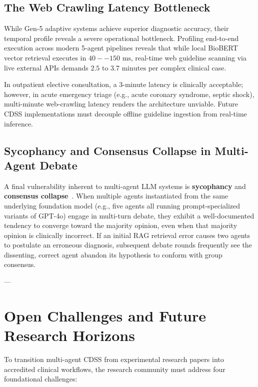 \documentclass[conference]{IEEEtran}
\begin{document}
\subsection{The Web Crawling Latency Bottleneck}
While Gen-5 adaptive systems achieve superior diagnostic accuracy, their temporal profile reveals a severe operational bottleneck. Profiling end-to-end execution across modern 5-agent pipelines reveals that while local BioBERT vector retrieval executes in $40--150\text{ ms}$, real-time web guideline scanning via live external APIs demands $2.5\text{ to }3.7\text{ minutes}$ per complex clinical case. 

In outpatient elective consultation, a 3-minute latency is clinically acceptable; however, in acute emergency triage (e.g., acute coronary syndrome, septic shock), multi-minute web-crawling latency renders the architecture unviable. Future CDSS implementations must decouple offline guideline ingestion from real-time inference.

\subsection{Sycophancy and Consensus Collapse in Multi-Agent Debate}
A final vulnerability inherent to multi-agent LLM systems is \textbf{sycophancy} and \textbf{consensus collapse}~\cite{chen2024reconcile}. When multiple agents instantiated from the same underlying foundation model (e.g., five agents all running prompt-specialized variants of GPT-4o) engage in multi-turn debate, they exhibit a well-documented tendency to converge toward the majority opinion, even when that majority opinion is clinically incorrect. If an initial RAG retrieval error causes two agents to postulate an erroneous diagnosis, subsequent debate rounds frequently see the dissenting, correct agent abandon its hypothesis to conform with group consensus.

---

\section{Open Challenges and Future Research Horizons}

To transition multi-agent CDSS from experimental research papers into accredited clinical workflows, the research community must address four foundational challenges:
\end{document}
